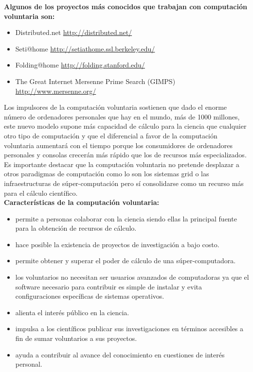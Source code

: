 \textbf{Algunos de los proyectos más conocidos que trabajan con computación voluntaria son:}\\

\begin{itemize}
 \item Distributed.net \url{http://distributed.net/}
 \item Seti@home \url{http://setiathome.ssl.berkeley.edu/}
 \item Folding@home \url{http://folding.stanford.edu/}
 \item The Great Internet Mersenne Prime Search (GIMPS) \url{http://www.mersenne.org/}
\end{itemize}

Los impulsores de la computación voluntaria sostienen que dado el enorme número de ordenadores personales que hay en el mundo, más de 1000 millones,
este nuevo modelo supone más capacidad de cálculo para la ciencia que cualquier otro tipo de computación y que el diferencial a favor de la computación
 voluntaria aumentará con el tiempo porque los consumidores de ordenadores personales y consolas crecerán más rápido que los de recursos más especializados. 
Es importante destacar que la computación voluntaria no pretende desplazar a otros paradigmas de computación como lo son los sistemas grid
o las infraestructuras de súper-computación pero sí consolidarse como un recurso más para el cálculo científico.\\

\textbf{Características de la computación voluntaria:}
\begin{itemize}
 \item permite a personas colaborar con la ciencia siendo ellas la principal fuente para la obtención de recursos de cálculo.
 \item hace posible la existencia de proyectos de investigación a bajo costo.
 \item permite obtener y superar el poder de cálculo de una súper-computadora.
 \item los voluntarios no necesitan ser usuarios avanzados de computadoras ya que el software necesario para contribuir es simple de instalar y evita configuraciones específicas de sistemas operativos.
 \item alienta el interés público en la ciencia.
 \item impulsa a los científicos publicar sus investigaciones en términos accesibles a fin de sumar voluntarios a sus proyectos.
 \item ayuda a contribuir al avance del conocimiento en cuestiones de interés personal.
\end{itemize}

